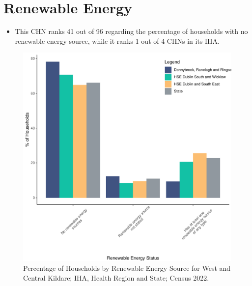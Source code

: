 \documentclass{article}
\begin{document}
\section{Renewable Energy}\label{sect:RE}
\begin{itemize}
\item This CHN ranks  41 out of 96 regarding the percentage of households with no renewable energy source, while it ranks   1 out of 4 CHNs in its IHA.
\end{itemize}
\begin{figure}[H]
	\centering
	\includegraphics[width = 140mm]{../figures/RenewableEnergyED.pdf}
	\caption{Percentage of Households by Renewable Energy Source for West and Central Kildare; IHA, Health Region and State; Census 2022.}
	\label{fig:vbnv}
	\end{figure}
\end{document}
